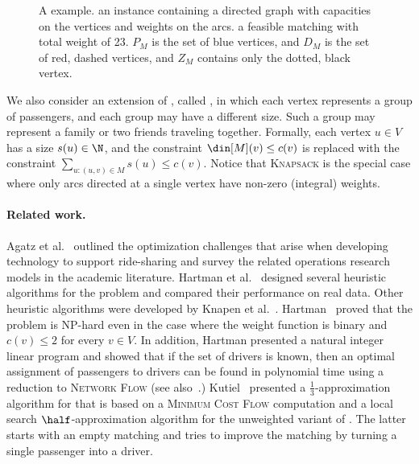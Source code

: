\begin{figure}
\caption[]{
\label{fig:carpool}
A \carpool example.
 an instance containing a
directed graph with capacities on the vertices and weights on the
arcs.   a feasible matching with total weight
of 23.  $P_M$ is the set of blue vertices, and $D_M$ is the set of
red, dashed vertices, and $Z_M$ contains only the dotted, black
vertex.
}
\end{figure}  

We also consider an extension of \carpool, called \gcp, in which each
vertex represents a group of passengers, and each group may have a
different size.  Such a group may represent a family or two friends
traveling together.  Formally, each vertex $u \in V$ has a size
$s(u) \in \N$, and the constraint $\din[M](v) \leq c(v)$ is replaced
with the constraint $\sum_{u:(u,v) \in M} s(u) \leq c(v)$.
Notice that \textsc{Knapsack} is the special case where only arcs
directed at a single vertex have non-zero (integral) weights.


\paragraph*{Related work.}
%
Agatz et al.~\cite{agatz2012optimization} outlined the optimization
challenges that arise when developing technology to support
ride-sharing and survey the related operations research models in the
academic literature.
%
Hartman et al.~\cite{hartman2014theory} designed several heuristic
algorithms for the \carpool problem and compared their performance on
real data.  Other heuristic algorithms were developed by Knapen et
al.~\cite{knapen2014exploiting}.
%
Hartman~\cite{hartman2013optimal} proved that the \carpool problem is
NP-hard even in the case where the weight function is binary and
$c(v) \leq 2$ for every $v \in V$.  In addition, Hartman presented a
natural integer linear program and showed that if the set of drivers
is known, then an optimal assignment of passengers to drivers can be
found in polynomial time using a reduction to \textsc{Network Flow}
(see also~\cite{kutiel2017}.)
%
Kutiel~\cite{kutiel2017} presented a $\frac{1}{3}$-approximation
algorithm for \carpool that is based on a \textsc{Minimum Cost Flow}
computation and a local search $\half$-approximation algorithm for the
unweighted variant of \carpool.  The latter starts with an empty
matching and tries to improve the matching by turning a single
passenger into a driver.

